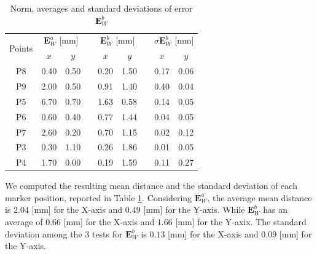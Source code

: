 \documentclass[a4paper, 10 pt, conference]{ieeeconf}      %
\begin{document}
\begin{table}[h!]
	\centering
	\caption{Norm, averages and standard deviations of error $\mathbf{E}^b_{W}$}
	\label{tab:laser}
	\begin{adjustbox}{max width=\textwidth}
		\begin{tabular}{ccccccccc}
			\hline
			\multirow{2}{*}{Points} & \multicolumn{2}{c}{$\mathbf{E}^a_{W}$ [mm]} &  & \multicolumn{2}{c}{$\mathbf{E}^b_{W}$ [mm]} &  & \multicolumn{2}{c}{$\sigma\mathbf{E}^b_{W}$ [mm]} \\ \cline{2-3} \cline{5-6} \cline{8-9} 
			& $x$                & $y$               &  & $x$                     & $y$                     &  & $x$                   & $y$                  \\ \hline
			P8                     & 0.40               & 0.50              &  & 0.20                    & 1.50                    &  & 0.17                  & 0.06                 \\
			P9                      & 2.00               & 0.50              &  & 0.91                    & 1.40                    &  & 0.40                  & 0.04                 \\
			P5                      & 6.70               & 0.70              &  & 1.63                    & 0.58                    &  & 0.14                  & 0.05                 \\
			P6                      & 0.60               & 0.40              &  & 0.77                    & 1.44                    &  & 0.04                  & 0.05                 \\
			P7                      & 2.60               & 0.20              &  & 0.70                    & 1.15                    &  & 0.02                  & 0.12                 \\
			P3                      & 0.30               & 1.10              &  & 0.26                    & 1.86                    &  & 0.01                  & 0.05                 \\
			P4                      & 1.70               & 0.00              &  & 0.19                    & 1.59                    &  & 0.11                  & 0.27                 \\ \hline
		\end{tabular}%
	\end{adjustbox}
\end{table}

We computed the resulting mean distance and the standard deviation of each marker position, reported in Table \ref{tab:laser}. Considering $\mathbf{E}^a_{W}$, the average mean distance is $2.04$ [mm] for the X-axis and $0.49$ [mm] for the Y-axis. While $\mathbf{E}^b_{W}$ has an average of $0.66$ [mm] for the X-axis and $1.66$ [mm] for the Y-axix. The standard deviation among the 3 tests for $\mathbf{E}^b_{W}$ is $0.13$ [mm] for the X-axis and $0.09$ [mm] for the Y-axis.
\end{document}
